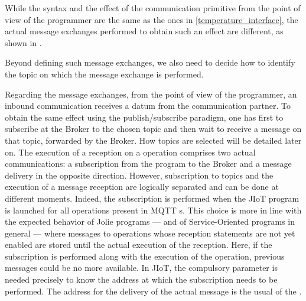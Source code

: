 While the syntax and the effect of the communication primitive from the point
of view of the programmer are the same as the ones in
\cref{temperature_interface}, the actual message exchanges performed to obtain
such an effect are different, as shown in .

Beyond defining such message exchanges, we also need to decide how to identify
the topic on which the message exchange is performed.

Regarding the message exchanges, from the point of view of the programmer, an
inbound  communication receives a datum from the communication
partner. To obtain the same effect using the publish/subscribe paradigm, one has
first to subscribe at the Broker to the chosen topic and then wait to receive a
message on that topic, forwarded by the Broker. How topics are selected will be
detailed later on. The execution of a reception on a  operation
comprises two actual communications: a subscription from the program to the
Broker and a message delivery in the opposite direction. However, subscription
to topics and the execution of a message reception are logically separated and
can be done at different moments. Indeed, the subscription is performed when the
JIoT program is launched for all operations present in MQTT
s. This choice is more in line with the expected behavior of
Jolie programs --- and of Service-Oriented programs in general --- where
messages to operations whose reception statements are not yet enabled are
stored until the actual execution of the reception.
%
Here, if the subscription is performed along with the execution of the
 operation, previous messages could be no more available.
%
In JIoT, the compulsory parameter  is needed precisely to know
the address at which the subscription needs to be performed. The address for the
delivery of the actual message is the usual  of the
.

